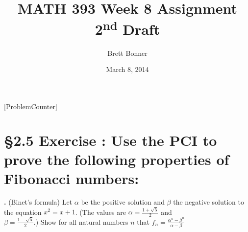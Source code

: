 \documentclass[a4paper,11pt]{article}
\begin{document}
\newtheorem*{theorem1}{Theorem}
\newtheorem*{theorem2}{Theorem}
\newtheorem*{theorem3}{Theorem}
\newtheorem*{theorem4}{Theorem}
\newtheorem*{theorem5}{Theorem}
\newtheorem*{theorem6}{Theorem}
\newtheorem*{theorem7}{Theorem}
\newtheorem*{theorem8}{Theorem}
\newtheorem*{theorem9}{True/False?}
\title{MATH 393 Week 8 Assignment 2\textsuperscript{nd} Draft}
\author{Brett Bonner}
\date{March 8, 2014}
\maketitle
\doublespacing
{}
[ProblemCounter]
\addtocounter{ProblemCounter}{6} %
\addtocounter{SubsectionCounter}{3} %
%

\setcounter{ProblemCounter}{6}
\section*{\S 2.5 Exercise : Use the PCI to prove the following properties of Fibonacci numbers:}
\setcounter{SubsectionCounter}{4}
\textbf{.}
(Binet's formula) Let \(\alpha\) be the positive solution and \(\beta\) the negative
solution to the equation \(x^2 = x + 1\). (The values are \(\alpha = \frac{1 + \sqrt{5}}{2}\) 
and\\
\(\beta = \frac{1-\sqrt{5}}{2}\).)
Show for all natural numbers \(n\) that
 \(f_n=\frac{\alpha^n-\beta^n}{\alpha - \beta}\)
\end{document}
